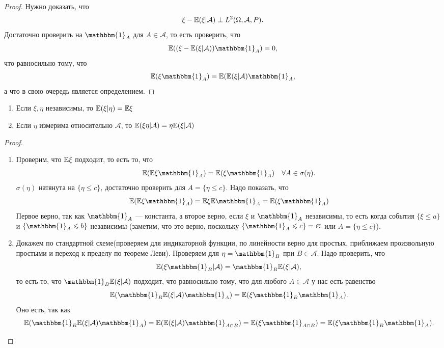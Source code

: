 \begin{proof} Нужно доказать, что
   $$\xi- \mathbb{E} (\xi | \mathcal{A} ) \perp L^2(\Omega, \mathcal{A}, P).$$ 
   Достаточно проверить на $\mathbbm{1}_A$ для $A\in\mathcal{A}$, то есть проверить, что
    $$\EE ((\xi - \EE (\xi | \mathcal{A}))\mathbbm{1}_A) = 0,$$ что равносильно тому, что
    $$\EE (\xi \mathbbm{1}_A) = \EE (\EE (\xi | \mathcal{A})\mathbbm{1}_A,$$
    а что в свою очередь является определением.
\end{proof}

\begin{theorem}
\enewline
    \begin{enumerate}
        \item Если $\xi, \eta$ независимы, то $\mathbb{E} (\xi | \eta) = \mathbb{E} \xi$
        \item Если $\eta$ измерима относительно $\mathcal{A}$, то $\mathbb{E} (\xi\eta | \mathcal{A}) = \eta \mathbb{E} (\xi | \mathcal{A})$
    \end{enumerate}
\end{theorem}


\begin{proof}
\enewline
    \begin{enumerate}
        \item Проверим, что $\mathbb{E} \xi$ подходит, то есть то, что 
        $$\EE (\EE \xi\mathbbm{1}_A) = \EE (\xi \mathbbm{1}_A) \quad \forall A\in \sigma(\eta).$$
              $\sigma(\eta)$ натянута на $\{\eta \le c\}$, достаточно проверить для $A = \{\eta \le c\}$.
              Надо показать, что
              $$\EE (\EE \xi\mathbbm{1}_A) = \EE \xi \EE \mathbbm{1}_A = \EE (\xi\mathbbm{1}_A)$$ 
              Первое верно, так как $\mathbbm{1}_A$ --- константа, а второе 
              верно, если $\xi $ и $\mathbbm{1}_A$ независимы, то есть когда события $\{\xi \le a\}$ и $\{\mathbbm{1}_A \le b\}$ независимы (заметим, что это верно, поскольку $\{\mathbbm{1}_A \le c\} = \emptyset$ или $A = \{\eta \le c\}$).

        \item Докажем по стандартной схеме(проверяем для индикаторной функции, по линейности верно для простых, приближаем произвольную простыми и переход к пределу по теореме Леви).
        Проверяем для $\eta = \mathbbm{1}_B$ при $B \in \mathcal{A}$. Надо проверить, что
              $$\EE (\xi\mathbbm{1}_B | \mathcal{A}) = \mathbbm{1}_B \EE (\xi | \mathcal{A}),$$ то есть то, что 
              $\mathbbm{1}_B \EE (\xi | \mathcal{A})$ подходит, что равносильно тому, что для любого $A\in \mathcal{A}$ у нас есть равенство
              $$\EE (\mathbbm{1}_B \EE (\xi | \mathcal{A}) \mathbbm{1}_A) = \EE (\xi \mathbbm{1}_B\mathbbm{1}_A).$$
              Оно есть, так как 
              $$\EE (\mathbbm{1}_B \EE (\xi | \mathcal{A}) \mathbbm{1}_A)  = \EE (\EE (\xi | \mathcal{A} ) \mathbbm{1}_{A\cap B}) = \EE (\xi\mathbbm{1}_{A\cap B}) = \EE (\xi \mathbbm{1}_B\mathbbm{1}_A).$$ \qedhere
    \end{enumerate}
\end{proof}
\newpage
